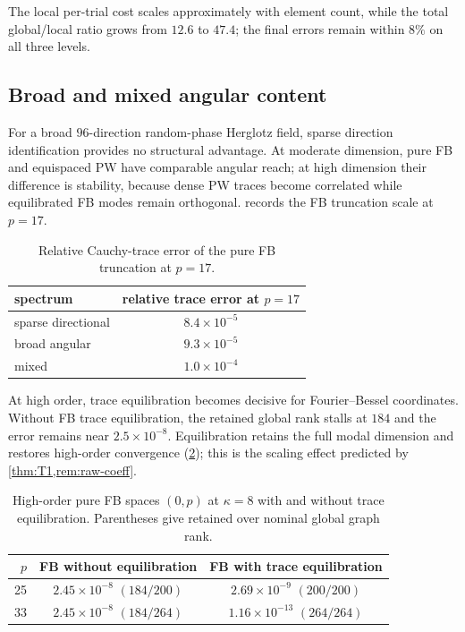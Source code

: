 \documentclass[11pt]{article}
\numberwithin{equation}{section}
\begin{document}
The local per-trial cost scales approximately with element count, while the total global/local ratio grows from $12.6$ to $47.4$; the final errors remain within $8\%$ on all three levels.


\subsection{Broad and mixed angular content}\label{sec:broad-content}
For a broad $96$-direction random-phase Herglotz field, sparse direction identification provides no structural advantage.  At moderate dimension, pure FB and equispaced PW have comparable angular reach; at high dimension their difference is stability, because dense PW traces become correlated while equilibrated FB modes remain orthogonal.   records the FB truncation scale at $p=17$.

\begin{table}[htbp]
\centering
\caption{Relative Cauchy-trace error of the pure FB truncation at $p=17$.}
\label{tab:p17-fb-trace}
\footnotesize
\begin{tabular}{lc}
\toprule
spectrum & relative trace error at $p=17$\\
\midrule
sparse directional & $8.4\times10^{-5}$\\
broad angular & $9.3\times10^{-5}$\\
mixed & $1.0\times10^{-4}$\\
\bottomrule
\end{tabular}
\end{table}

At high order, trace equilibration becomes decisive for Fourier--Bessel coordinates.
Without FB trace equilibration, the retained global rank stalls at $184$ and the error remains near $2.5\times10^{-8}$.  Equilibration retains the full modal dimension and restores high-order convergence (\cref{tab:equil}); this is the scaling effect predicted by \cref{thm:T1,rem:raw-coeff}.

\begin{table}[htbp]
\centering
\caption{High-order pure FB spaces $(0,p)$ at $\kappa=8$ with and without trace equilibration.  Parentheses give retained over nominal global graph rank.}
\label{tab:equil}
\footnotesize
\begin{tabular}{rcc}
\toprule
$p$ & FB without equilibration & FB with trace equilibration\\
\midrule
25 & $2.45\times10^{-8}$ $(184/200)$ & $2.69\times10^{-9}$ $(200/200)$\\
33 & $2.45\times10^{-8}$ $(184/264)$ & $1.16\times10^{-13}$ $(264/264)$\\
\bottomrule
\end{tabular}
\end{table}
\end{document}
